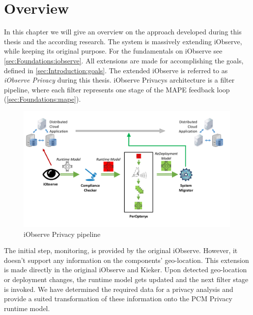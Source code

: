
\chapter{Overview}
\label{ch:Overview}

In this chapter we will give an overview on the approach developed during this thesis and the according research. The system is massively extending iObserve, while keeping its original purpose. For the fundamentals on iObserve see \autoref{sec:Foundations:iobserve}. All extensions are made for accomplishing the goals, defined in \autoref{sec:Introduction:goals}. The extended iObserve is referred to as \textit{iObserve Privacy} during this thesis. iObserve Privacys architecture is a filter pipeline, where each filter represents one stage of the MAPE feedback loop (\autoref{sec:Foundations:mape}).


\begin{figure}[h]
	\centering
	\includegraphics[width=0.99\textwidth]{pictures/pipeline}
	\caption{iObserve Privacy pipeline}
	\label{fig:pipeline}
\end{figure}

The initial step, monitoring, is provided by the original iObserve. However, it doesn't support any information on the components' geo-location. This extension is made directly in the original iObserve and Kieker. Upon detected geo-location or deployment changes, the runtime model gets updated and the next filter stage is invoked. We have determined the required data for a privacy analysis and provide a suited transformation of these information onto the PCM Privacy runtime model.

